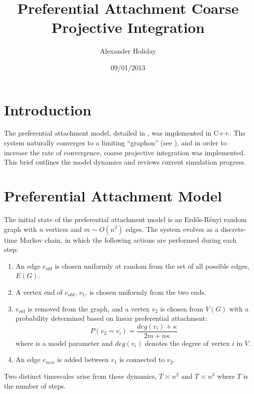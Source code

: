 \documentclass[11pt]{article}
\begin{document}
\title{Preferential Attachment Coarse Projective Integration}
\author{Alexander Holiday\vspace{-2ex}}
\date{09/01/2013}
\maketitle
\section*{Introduction}
The preferential attachment model, detailed in \cite{balasz:rsa12}, was implemented in C++. The system naturally converges to a limiting ``graphon'' (see \cite{lovasz:jcombth06}), and in order to increase the rate of convergence, coarse projective integration was implemented. This brief outlines the model dynamics and reviews current simulation progress.
\section*{Preferential Attachment Model}
The initial state of the preferential attachment model is an Erd\H{o}s-R\'{e}nyi random graph with $n$ vertices and $m\sim O(n^{2})$ edges. The system evolves as a discrete-time Markov chain, in which the following actions are performed during each step:
\begin{enumerate}
\item An edge $e_{old}$ is chosen uniformly at random from the set of all possible edges, $E(G)$.
\item A vertex end of $e_{old}$, $v_{1}$, is chosen uniformly from the two ends.
\item $e_{old}$ is removed from the graph, and a vertex $v_{2}$ is chosen from $V(G)$ with a probability determined based on linear preferential attachment:
\[
P(v_{2}=v_{i})=\frac{deg(v_{i})+\kappa}{2m+n\kappa}
\]
where \kappa is a model parameter and $deg(v_{i})$ denotes the degree of vertex $i$ in $V$.
\item An edge $e_{new}$ is added between $v_{1}$ is connected to $v_{2}$.
\end{enumerate}
Two distinct timescales arise from these dynamics, $T\asymp n^{2}$ and $T\asymp n^{3}$ where $T$ is the number of steps.
\end{document}
